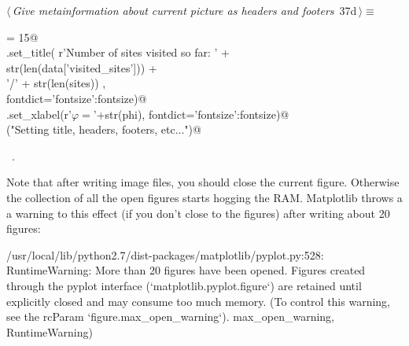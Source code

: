 \documentclass[11.5pt]{report}
\newenvironment{CVerbatim}
 {\singlespacing\center\BVerbatim}
 {\endBVerbatim\endcenter}
\begin{document}
\begin{flushleft} \small\label{scrap37}\raggedright\small
{} $\langle\,${\itshape Give metainformation about current picture as headers and footers}\nobreak\ {\footnotesize {37d}}$\,\rangle\equiv$
\vspace{-1ex}
\begin{list}{}{} \item
\mbox{}\verb@fontsize = 15@\\
\mbox{}\verb@ax.set_title( r'Number of sites visited so far: ' +\@\\
\mbox{}\verb@               str(len(data['visited_sites']))   +\@\\
\mbox{}\verb@               '/' + str(len(sites))           ,  \@\\
\mbox{}\verb@                    fontdict={'fontsize':fontsize})@\\
\mbox{}\verb@ax.set_xlabel(r'$\varphi=$'+str(phi), fontdict={'fontsize':fontsize})@\\
\mbox{}\verb@debug("Setting title, headers, footers, etc...")@\\
\mbox{}\verb@@{\NWsep}
\end{list}
\vspace{-1.5ex}
\footnotesize
\begin{list}{}{\setlength{\itemsep}{-\parsep}\setlength{\itemindent}{-\leftmargin}}
\item \NWtxtMacroRefIn\ .

\item{}
\end{list}
\vspace{4ex}
\end{flushleft}
\vspace{-0.8cm}
Note that after writing image files, you should close the current figure. Otherwise
the collection of all the open figures starts hogging the RAM. Matplotlib throws a
a warning to this effect (if you don't close to the figures) after writing about 
20 figures:

\begin{CVerbatim}[fontsize=\small]
/usr/local/lib/python2.7/dist-packages/matplotlib/pyplot.py:528: RuntimeWarning: 
More than 20 figures have been opened. Figures created through the pyplot interface 
(`matplotlib.pyplot.figure`) are retained until explicitly closed and may consume 
too much memory. (To control this warning, see the rcParam `figure.max_open_warning`).
max_open_warning, RuntimeWarning)
\end{CVerbatim}
\end{document}
